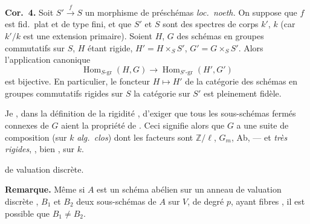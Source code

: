 \documentclass[11pt,a4paper]{article}
\begin{document}
\textbf{Cor.~4.} Soit $S' \xrightarrow{f} S$ un morphisme de préschémas
\emph{loc.\ noeth.} On suppose que $f$ est fid.\ plat et de type fini, et
que $S'$ et $S$ sont des spectres de corps \struck{\ill{}} $k'$, $k$
(car $k'/k$ est une extension primaire).  Soient
 $H$, $G$ des schémas en groupes
 commutatifs sur $S$, $H$ étant rigide,
$H' = H \times_S S'$, $G' = G \times_S S'$. Alors l'application canonique
\[
  \operatorname{Hom}_{S\text{-gr}}(H, G) \longrightarrow
  \operatorname{Hom}_{S'\text{-gr}}(H', G')
\]
est bijective. En particulier, le foncteur $H \mapsto H'$ de la catégorie
des schémas  en groupes commutatifs rigides sur $S$
 \ill{} \ill{} la catégorie  \ill{} \ill{} \ill{} sur $S'$ est pleinement fidèle.

Je \ill{} \ill{} \ill{}, dans la définition de la rigidité ,
d'exiger que tous les sous-schémas fermés  connexes de
$G$ aient la propriété de \ill{}. Ceci signifie alors que $G$ a une suite de
composition (sur $k$ \emph{alg.\ clos}) \struck{\ill{}} dont les facteurs sont
$\mathbb{Z}/\ell$, $G_m$, Ab, — et \ill{}  \ill{}
\emph{très rigides}, \ill{} \ill{} \ill{} \ill{}, \ill{} \ill{} bien \ill{}
\ill{} \ill{}, \ill{} \ill{} \ill{} \ill{} \ill{} \ill{} \ill{} \ill{}
\ill{} sur $k$.


 de valuation
discrète.

\textbf{Remarque.} Même si $A$ est un schéma abélien sur un anneau de
valuation discrète , $B_1$ et $B_2$ deux
sous-schémas \ill{} de $A$  \struck{\ill{}} sur $V$,
de degré $p$, ayant \ill{} fibres \ill{} \ill{} \ill{}, il est possible que
$B_1 \neq B_2$.
\end{document}
